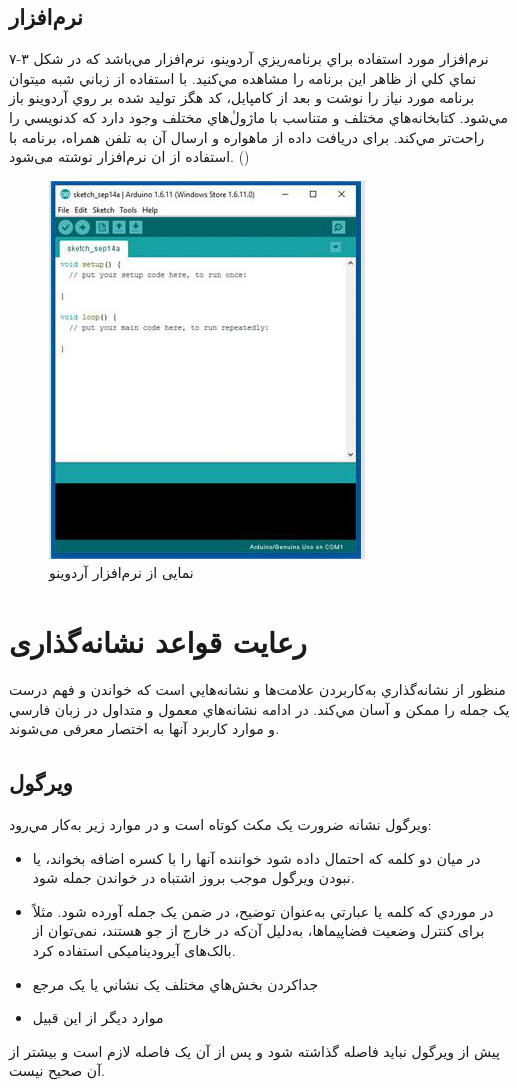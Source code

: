 \subsection{نرم‌افزار }
نرم‌افزار مورد استفاده براي برنامه‌ريزي آردوينو، نرم‌افزار   مي‌باشد كه در شکل ۳-۷ نماي كلي از ظاهر اين برنامه را مشاهده مي‌كنيد. با استفاده از زباني شبه  ميتوان برنامه مورد نياز را نوشت و بعد از كامپايل، كد هگز توليد شده بر روي آردوينو باز مي‌شود. كتابخانه‌هاي مختلف و متناسب با ماژولٰ‌هاي مختلف وجود دارد كه كدنويسي را راحت‌تر مي‌كند. برای دریافت داده از ماهواره و ارسال آن به تلفن همراه، برنامه با استفاده از ان نرم‌افزار نوشته می‌شود. ()
\begin{figure}[!h]
	\centerline{\includegraphics[width=.4\textwidth]{arduino-ide}}
	\caption{نمایی از نرم‌افزار آردوینو}
\end{figure}
\subsection{}
\section{رعایت قواعد نشانه‌گذاری}
منظور از نشانه‌گذاري به‌کار‌بردن علامت‌ها و نشانه‌هايي است که خواندن و فهم درست یک جمله را ممکن و آسان مي‌کند. در ادامه نشانه‌هاي معمول و متداول در زبان فارسي و موارد کاربرد آنها به اختصار معرفی می‌شوند.

\subsection{ويرگول}
ويرگول نشانه ضرورت یک مکث کوتاه است و در موارد زير به‌کار مي‌رود:
\begin{itemize}
\item
در ميان دو کلمه که احتمال داده شود خواننده آنها را با کسره اضافه بخواند، يا نبودن ويرگول موجب بروز اشتباه در خواندن جمله شود.
\item
در موردي که کلمه يا عبارتي به‌‌‌‌عنوان توضيح، در ضمن یک جمله آورده شود. مثلاً برای کنترل وضعیت فضاپیماها، به‌دلیل آن‌که در خارج از جو هستند، نمی‌توان از بالک‌های آیرودینامیکی استفاده کرد.
\item
جدا‌کردن بخش‌هاي مختلف يک نشاني يا یک مرجع
\item
موارد دیگر از این قبیل
\end{itemize}
پیش از ويرگول نبايد فاصله گذاشته شود و پس از آن يک فاصله لازم است و بيشتر از آن صحیح نیست.
